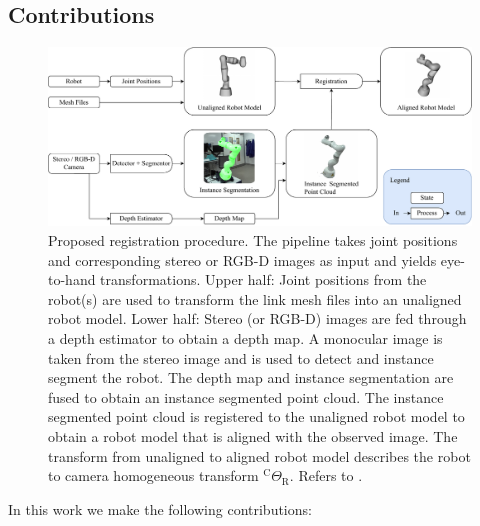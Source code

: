 \subsection{Contributions}
\begin{figure}[tb]
    \centering
    \includegraphics[width=\textwidth]{chapter_1/fig/approach_refined.pdf}
    \caption{Proposed registration procedure. The pipeline takes joint positions and corresponding stereo or RGB-D images as input and yields eye-to-hand transformations. Upper half: Joint positions from the robot(s) are used to transform the link mesh files into an unaligned robot model. Lower half: Stereo (or RGB-D) images are fed through a depth estimator to obtain a depth map. A monocular image is taken from the stereo image and is used to detect and instance segment the robot. The depth map and instance segmentation are fused to obtain an instance segmented point cloud. The instance segmented point cloud is registered to the unaligned robot model to obtain a robot model that is aligned with the observed image. The transform from unaligned to aligned robot model describes the robot to camera homogeneous transform $^\text{C}\Theta_\text{R}$. Refers to .}
    \label{c1:fig:calibration_pipeline}
\end{figure}
In this work we make the following contributions:
